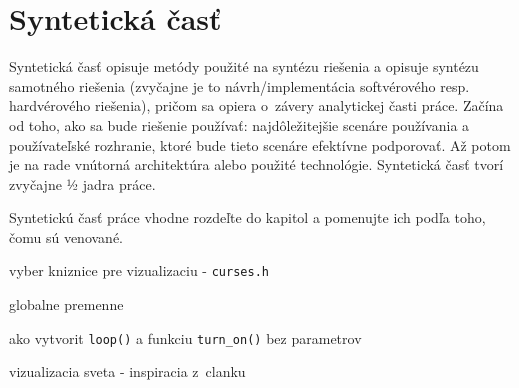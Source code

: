 
\chapter{Syntetická časť}
\label{methodology}

Syntetická časť opisuje metódy použité na syntézu riešenia a opisuje syntézu samotného riešenia (zvyčajne je to návrh/implementácia softvérového resp. hardvérového riešenia), pričom sa opiera o~závery analytickej časti práce. Začína od toho, ako sa bude riešenie používať: najdôležitejšie scenáre používania a používateľské rozhranie, ktoré bude tieto scenáre efektívne podporovať. Až potom je na rade vnútorná architektúra alebo použité technológie. Syntetická časť tvorí zvyčajne ½ jadra práce.

Syntetickú časť práce vhodne rozdeľte do kapitol a pomenujte ich podľa toho, čomu sú venované.


vyber kniznice pre vizualizaciu - \texttt{curses.h}

globalne premenne

ako vytvorit \texttt{loop()} a funkciu \texttt{turn\_on()} bez parametrov

vizualizacia sveta - inspiracia z~clanku \cite{Untch1990}
